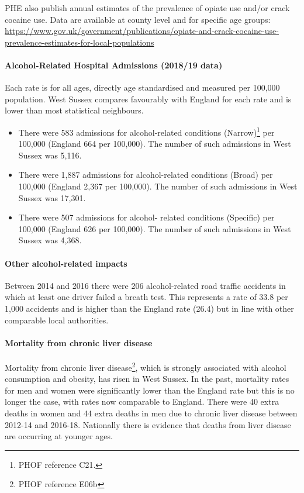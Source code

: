 PHE also publish annual estimates of the prevalence of opiate use and/or crack cocaine use. Data are available at county level and for specific age groups: \url{https://www.gov.uk/government/publications/opiate-and-crack-cocaine-use-prevalence-estimates-for-local-populations}

\paragraph{Alcohol-Related Hospital Admissions (2018/19 data)} Each rate is for all ages, directly age standardised and measured per 100,000 population. West Sussex compares favourably with England for each rate and is lower than most statistical neighbours.
\begin{itemize}[noitemsep]
    \item There were 583 admissions for alcohol-related conditions (Narrow)\footnote{PHOF reference C21.} per 100,000 (England 664 per 100,000). The number of such admissions in West Sussex was 5,116.
    \item There were 1,887 admissions for alcohol-related conditions (Broad) per 100,000 (England 2,367 per 100,000). The number of such admissions in West Sussex was 17,301.
    \item There were 507 admissions for alcohol- related conditions (Specific) per 100,000 (England 626 per 100,000). The number of such admissions in West Sussex was 4,368.
\end{itemize}
  
\paragraph{Other alcohol-related impacts}
Between 2014 and 2016 there were 206 alcohol-related road traffic accidents in which at least one driver failed a breath test. This represents a rate of 33.8 per 1,000 accidents and is higher than the England rate (26.4) but in line with other comparable local authorities.

\paragraph{Mortality from chronic liver disease} Mortality from chronic liver disease\footnote{PHOF reference E06b}, which is strongly associated with alcohol consumption and obesity, has risen in West Sussex. In the past, mortality rates for men and women were significantly lower than the England rate but this is no longer the case, with rates now comparable to England. There were 40 extra deaths in women and 44 extra deaths in men due to chronic liver disease between 2012-14 and 2016-18. Nationally there is evidence that deaths from liver disease are occurring at younger ages.

